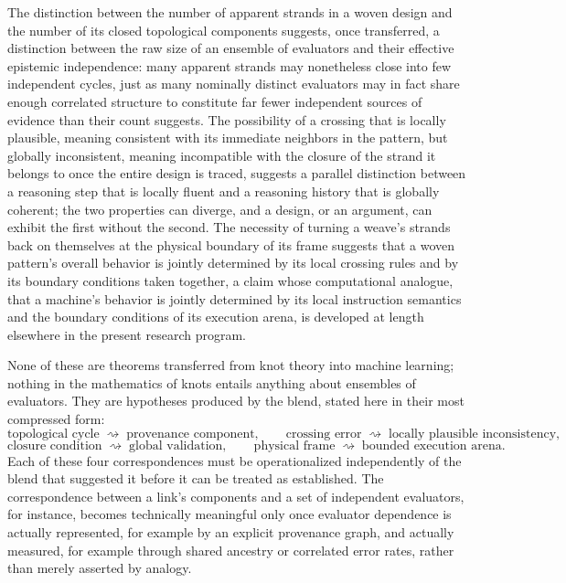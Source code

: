 \documentclass[11pt,openany]{book}
\begin{document}
The distinction between the number of apparent strands in a woven design and the number of its closed topological components suggests, once transferred, a distinction between the raw size of an ensemble of evaluators and their effective epistemic independence: many apparent strands may nonetheless close into few independent cycles, just as many nominally distinct evaluators may in fact share enough correlated structure to constitute far fewer independent sources of evidence than their count suggests. The possibility of a crossing that is locally plausible, meaning consistent with its immediate neighbors in the pattern, but globally inconsistent, meaning incompatible with the closure of the strand it belongs to once the entire design is traced, suggests a parallel distinction between a reasoning step that is locally fluent and a reasoning history that is globally coherent; the two properties can diverge, and a design, or an argument, can exhibit the first without the second. The necessity of turning a weave's strands back on themselves at the physical boundary of its frame suggests that a woven pattern's overall behavior is jointly determined by its local crossing rules and by its boundary conditions taken together, a claim whose computational analogue, that a machine's behavior is jointly determined by its local instruction semantics and the boundary conditions of its execution arena, is developed at length elsewhere in the present research program.

None of these are theorems transferred from knot theory into machine learning; nothing in the mathematics of knots entails anything about ensembles of evaluators. They are hypotheses produced by the blend, stated here in their most compressed form:
\[
\text{topological cycle} \;\rightsquigarrow\; \text{provenance component}, \qquad
\text{crossing error} \;\rightsquigarrow\; \text{locally plausible inconsistency},
\]
\[
\text{closure condition} \;\rightsquigarrow\; \text{global validation}, \qquad
\text{physical frame} \;\rightsquigarrow\; \text{bounded execution arena}.
\]
Each of these four correspondences must be operationalized independently of the blend that suggested it before it can be treated as established. The correspondence between a link's components and a set of independent evaluators, for instance, becomes technically meaningful only once evaluator dependence is actually represented, for example by an explicit provenance graph, and actually measured, for example through shared ancestry or correlated error rates, rather than merely asserted by analogy.
\end{document}
